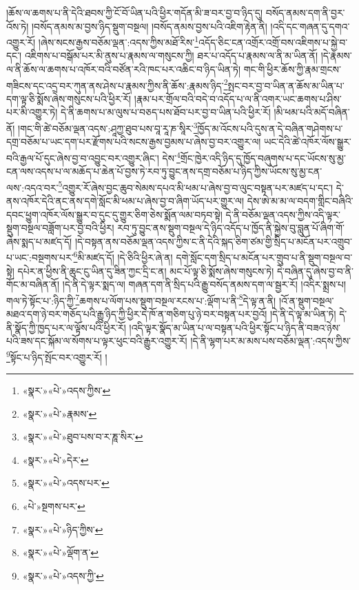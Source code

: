 །ཆོས་ལ་ཆགས་པ་ནི་དེའི་ཐབས་ཀྱི་ངོ་བོ་ཡིན་པའི་ཕྱིར་གདོན་མི་ཟ་བར་བྱ་བ་ཉིད་དུ། བསོད་ནམས་དག་ནི་བྱར་འོས་ཏེ། །བསོད་ནམས་མ་བྱས་ཉིད་སྡུག་བསྔལ། །བསོད་ནམས་བྱས་པའི་འཇིག་རྟེན་ནི། །འདི་དང་གཞན་དུ་དགའ་འགྱུར་རོ། །ཞེས་སངས་རྒྱས་བཅོམ་ལྡན་:འདས་ཀྱིས་མཐོ་རིས་\footnote{«སྣར་»«པེ་»འདས་ཀྱིས་}འདོད་ཅིང་ངན་འགྲོར་འགྲོ་བས་འཇིགས་པ་སྐྱེ་བ་དང་། འཇིགས་པ་བསྒོམ་པར་མི་ནུས་པ་རྣམས་ལ་གསུངས་ཀྱི། ཐར་པ་འདོད་པ་རྣམས་ལ་ནི་མ་ཡིན་ནོ། །དེ་རྣམས་ལ་ནི་ཆོས་ལ་ཆགས་པ་འཁོར་བའི་བཙོན་རའི་ཁང་པར་འཆིང་བ་ཉིད་ཡིན་ཏེ། གང་གི་ཕྱིར་ཆོས་ཀྱི་རྣམ་གྲངས་གཟིངས་དང་འདྲ་བར་ཀུན་ནས་ཤེས་པ་རྣམས་ཀྱིས་ནི་ཆོས་:རྣམས་ཉིད་\footnote{«སྣར་»«པེ་»རྣམས་}སྤང་བར་བྱ་བ་ཡིན་ན་ཆོས་མ་ཡིན་པ་དག་ལྟ་ཅི་སྨོས་ཞེས་གསུངས་པའི་ཕྱིར་རོ། །རྣམ་པར་གྲོལ་བའི་བདེ་བ་འདོད་པ་ལ་ནི་འགར་ཡང་ཆགས་པ་ཤིས་པར་མི་འགྱུར་ཏེ། དེ་ནི་ཆགས་པ་མ་ལུས་པ་བཅད་པས་ཐོབ་པར་བྱ་བ་ཡིན་པའི་ཕྱིར་རོ། །མི་ཕམ་པའི་མདོ་བཞིན་ནོ། །གང་གི་ཚེ་བཅོམ་ལྡན་འདས་:ཤཱཀྱ་ཐུབ་པས་བཱ་རཱ་ཎ་སཱིར་\footnote{«སྣར་»«པེ་»ཐུབ་པས་བ་ར་ཎཱ་སིར་}ཁྱོད་མ་འོངས་པའི་དུས་ན་དེ་བཞིན་གཤེགས་པ་དགྲ་བཅོམ་པ་ཡང་དག་པར་རྫོགས་པའི་སངས་རྒྱས་བྱམས་པ་ཞེས་བྱ་བར་འགྱུར་ལ། ཡང་དེའི་ཚེ་འཁོར་ལོས་སྒྱུར་བའི་རྒྱལ་པོ་དུང་ཞེས་བྱ་བ་འབྱུང་བར་འགྱུར་ཞིང་། དེས་\footnote{«སྣར་»«པེ་»དེར་}གྲོང་ཁྱེར་འདི་ཉིད་དུ་ཁྱོད་བཞུགས་པ་དང་ཡོངས་སུ་མྱ་ངན་ལས་འདས་པ་ལ་མཆོད་པ་ཆེན་པོ་བྱས་ཏེ་རབ་ཏུ་བྱུང་ནས་དགྲ་བཅོམ་པ་ཉིད་ཀྱིས་ཡོངས་སུ་མྱ་ངན་ལས་:འདའ་བར་\footnote{«སྣར་»«པེ་»འདས་པར་}འགྱུར་རོ་ཞེས་བྱང་ཆུབ་སེམས་དཔའ་མི་ཕམ་པ་ཞེས་བྱ་བ་ལུང་བསྟན་པར་མཛད་པ་དང་། དེ་ནས་འཁོར་དེའི་ནང་ནས་དགེ་སློང་མི་ཕམ་པ་ཞེས་བྱ་བ་ཞིག་ཡོད་པར་གྱུར་ལ། དེས་ཨེ་མ་མ་ལ་བདག་གླིང་བཞིའི་དབང་ཕྱུག་འཁོར་ལོས་སྒྱུར་བ་དུང་དུ་གྱུར་ཅིག་ཅེས་སྨོན་ལམ་བཏབ་སྟེ། དེ་ནི་བཅོམ་ལྡན་འདས་ཀྱིས་འདི་ལྟར་སྡུག་བསྔལ་བཟློག་པར་བྱ་བའི་ཕྱིར། རབ་ཏུ་བྱུང་ནས་སྡུག་བསྔལ་དེ་ཉིད་འདོད་པ་ཁྱོད་ནི་སྐྱེས་བུ་བླུན་པོ་ཞིག་གོ་ཞེས་སྨད་པ་མཛད་དོ། །དེ་བསྟན་ནས་བཅོམ་ལྡན་འདས་ཀྱིས་ང་ནི་དེའི་སྐད་ཅིག་ཙམ་གྱི་སྲིད་པ་མངོན་པར་འགྲུབ་པ་ཡང་:བསྔགས་པར་\footnote{«པེ་»སྔགས་པར་}མི་མཛད་དོ། །དེ་ཅིའི་ཕྱིར་ཞེ་ན། དགེ་སློང་དག་སྲིད་པ་མངོན་པར་གྲུབ་པ་ནི་སྡུག་བསྔལ་བ་སྟེ། དཔེར་ན་ཕྱིས་ནི་ཆུང་ངུ་ཡིན་དུ་ཟིན་ཀྱང་དྲི་ང་ན། མང་པོ་ལྟ་ཅི་སྨོས་ཞེས་གསུངས་ཏེ། དེ་བཞིན་དུ་ཞེས་བྱ་བ་ནི་གོང་མ་བཞིན་ནོ། །དེ་ནི་དེ་ལྟར་སྨད་ལ། གཞན་དག་ནི་སྲིད་པའི་རྒྱུ་བསོད་ནམས་དག་ལ་སྦྱར་རོ། །འདིར་སྨྲས་པ། གལ་ཏེ་སྟོང་པ་:ཉིད་ཀྱི་\footnote{«སྣར་»«པེ་»ཉིད་ཀྱིས་}ཆགས་པ་ལོག་པས་སྡུག་བསྔལ་རངས་པ་:ལྡོག་པ་ནི་\footnote{«སྣར་»«པེ་»ལྡོག་ན་}དེ་ལྟ་ན་ནི། །འོ་ན་སྡུག་བསྔལ་མཐའ་དག་ཉེ་བར་གཅོད་པའི་རྒྱུ་ཉིད་ཀྱི་ཕྱིར་དེ་ཁོ་ན་གཅིག་པུ་ཉེ་བར་བསྟན་པར་བྱའོ། །དེ་ནི་དེ་ལྟ་མ་ཡིན་ཏེ། དེ་ནི་སྣོད་ཀྱི་ཁྱད་པར་ལ་ལྟོས་པའི་ཕྱིར་རོ། །འདི་ལྟར་སྣོད་མ་ཡིན་པ་ལ་བསྟན་པའི་ཕྱིར་སྟོང་པ་ཉིད་ནི་བཟའ་ཉེས་པའི་ཟས་དང་སྐོམ་ལ་སོགས་པ་ལྟར་ཕུང་བའི་རྒྱུར་འགྱུར་རོ། །དེ་ནི་ལྷག་པར་མ་མས་པས་བཅོམ་ལྡན་:འདས་ཀྱིས་\footnote{«སྣར་»«པེ་»འདས་ཀྱི་}སྟོང་པ་ཉིད་སྤོང་བར་འགྱུར་རོ། །
